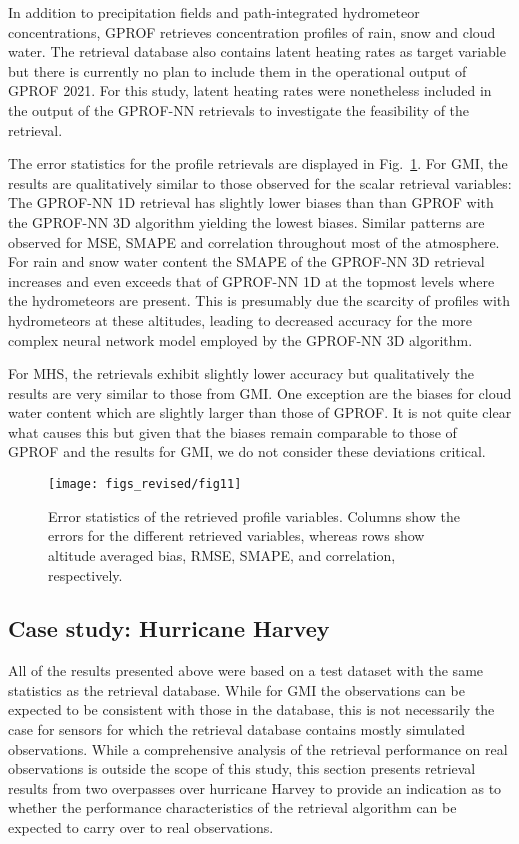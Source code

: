 \documentclass[journal abbreviation, manuscript]{copernicus}
\begin{document}
In addition to precipitation fields and path-integrated hydrometeor
concentrations, GPROF retrieves concentration profiles of rain, snow and cloud
water. The retrieval database also contains latent heating rates as target
variable but there is currently no plan to include them in the operational
output of GPROF 2021. For this study, latent heating rates were nonetheless
included in the output of the GPROF-NN retrievals to investigate the feasibility
of the retrieval.

The error statistics for the profile retrievals are displayed in
Fig.~\ref{fig:results_profiles}. For GMI, the results are qualitatively similar
to those observed for the scalar retrieval variables: The GPROF-NN 1D retrieval
has slightly lower biases than than GPROF with the GPROF-NN 3D algorithm
yielding the lowest biases. Similar patterns are observed for MSE, SMAPE and
correlation throughout most of the atmosphere. For rain and snow water content
the SMAPE of the GPROF-NN 3D retrieval increases and even exceeds that of
GPROF-NN 1D at the topmost levels where the hydrometeors are present. This is
presumably due the scarcity of profiles with hydrometeors at these altitudes,
leading to decreased accuracy for the more complex neural network model employed
by the GPROF-NN 3D algorithm.

For MHS, the retrievals exhibit slightly lower accuracy but qualitatively the results
are very similar to those from GMI. One exception are the biases for cloud water
content which are slightly larger than those of GPROF. It is not quite clear what
causes this but given that the biases remain comparable to those of GPROF and the results
for GMI, we do not consider these deviations critical.

\begin{figure}[hbpt]
  \centering
  \texttt{[image: figs\_revised/fig11]}
  \caption{
    Error statistics of the retrieved profile variables. Columns show the
    errors for the different retrieved variables, whereas rows show 
    altitude averaged bias, RMSE, SMAPE, and correlation, respectively.
  }
  \label{fig:results_profiles}
\end{figure}




\subsection{Case study: Hurricane Harvey}

All of the results presented above were based on a test dataset with the same
statistics as the retrieval database. While for GMI the observations can be
expected to be consistent with those in the database, this is not necessarily
the case for  sensors for which the retrieval database contains mostly
simulated observations. While a comprehensive analysis of the retrieval
performance on real observations is outside the scope of this study, this
section presents retrieval results from two overpasses over hurricane Harvey to
provide an indication as to whether the performance characteristics of the
retrieval algorithm can be expected to carry over to real observations.
\end{document}
